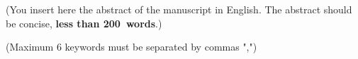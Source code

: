 \begin{abstractEn}
	
	(You insert here the abstract of the manuscript in English. The abstract should be concise, \textbf{less than 200~words}.)
	
\end{abstractEn}

\begin{keywordsEn}
	(Maximum 6 keywords must be separated by commas ",")
\end{keywordsEn}